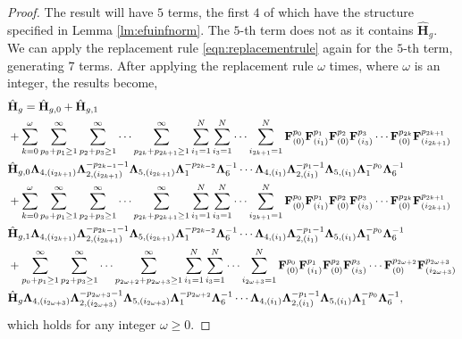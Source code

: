 \documentclass[twoside,11pt]{article}
\newcommand{\matF}{\mathbf{F}}
\newcommand{\hmatH}{{\hat{\mathbf{H}}}{}}
\newcommand{\matLambda}{\mathbf{\Lambda}}
\begin{document}
\begin{proof}
The result will have $5$ terms, the first $4$ of which have the structure specified in Lemma \ref{lm:efuinfnorm}. The $5$-th term does not as it contains $\hmatH_g$. We can apply the replacement rule \eqref{eqn:replacementrule} again for the $5$-th term, generating $7$ terms. After applying the replacement rule $\omega$ times, where $\omega$ is an integer, the results become,
\begin{align}
\label{eqn:ugrawform}
&\hmatH_{g}=\hmatH_{g,0}+\hmatH_{g,1}\notag\\
&+\sum_{k=0}^{\omega}\sum_{p_0+p_1\ge 1}^{\infty}\sum_{p_2+p_3\ge 1}^{\infty}\cdots\sum_{p_{2k}+p_{2k+1}\ge 1}^{\infty}\sum_{i_1=1}^{N}\sum_{i_3=1}^{N}\cdots\sum_{i_{2k+1}=1}^{N}\matF_{(0)}^{p_0}\matF_{(i_1)}^{p_1}\matF_{(0)}^{p_2}\matF_{(i_3)}^{p_3}\cdots \matF_{(0)}^{p_{2k}}\matF_{(i_{2k+1})}^{p_{2k+1}}\notag\\
&\hmatH_{g,0}\matLambda_{4,(i_{2k+1})}\matLambda_{2,(i_{2k+1})}^{-p_{2k-1}-1}\matLambda_{5,(i_{2k+1})}\matLambda_{1}^{-p_{2k-2}}\matLambda_6^{-1}\cdots \matLambda_{4,(i_{1})}\matLambda_{2,(i_{1})}^{-p_{1}-1}\matLambda_{5,(i_{1})}\matLambda_{1}^{-p_{0}}\matLambda_6^{-1}\notag\\
&+\sum_{k=0}^{\omega}\sum_{p_0+p_1\ge 1}^{\infty}\sum_{p_2+p_3\ge 1}^{\infty}\cdots\sum_{p_{2k}+p_{2k+1}\ge 1}^{\infty}\sum_{i_1=1}^{N}\sum_{i_3=1}^{N}\cdots\sum_{i_{2k+1}=1}^{N}\matF_{(0)}^{p_0}\matF_{(i_1)}^{p_1}\matF_{(0)}^{p_2}\matF_{(i_3)}^{p_3}\cdots \matF_{(0)}^{p_{2k}}\matF_{(i_{2k+1})}^{p_{2k+1}}\notag\\
&\hmatH_{g,1}\matLambda_{4,(i_{2k+1})}\matLambda_{2,(i_{2k+1})}^{-p_{2k-1}-1}\matLambda_{5,(i_{2k+1})}\matLambda_{1}^{-p_{2k-2}}\matLambda_6^{-1}\cdots \matLambda_{4,(i_{1})}\matLambda_{2,(i_{1})}^{-p_{1}-1}\matLambda_{5,(i_{1})}\matLambda_{1}^{-p_{0}}\matLambda_6^{-1}\notag\\
&+\sum_{p_0+p_1\ge 1}^{\infty}\sum_{p_2+p_3\ge 1}^{\infty}\cdots\sum_{p_{2\omega+2}+p_{2\omega+3}\ge 1}^{\infty}\sum_{i_1=1}^{N}\sum_{i_3=1}^{N}\cdots\sum_{i_{2\omega+3}=1}^{N}\matF_{(0)}^{p_0}\matF_{(i_1)}^{p_1}\matF_{(0)}^{p_2}\matF_{(i_3)}^{p_3}\cdots \matF_{(0)}^{p_{2\omega+2}}\matF_{(i_{2\omega+3})}^{p_{2\omega+3}}\notag\\
&\hmatH_{g}\matLambda_{4,(i_{2\omega+3})}\matLambda_{2,(i_{2\omega+3})}^{-p_{2\omega+3}-1}\matLambda_{5,(i_{2\omega+3})}\matLambda_{1}^{-p_{2\omega+2}}\matLambda_6^{-1}\cdots \matLambda_{4,(i_{1})}\matLambda_{2,(i_{1})}^{-p_{1}-1}\matLambda_{5,(i_{1})}\matLambda_{1}^{-p_0}\matLambda_6^{-1},\notag\\
\end{align}
which holds for any integer $\omega\ge 0$.


\end{proof}
\end{document}
